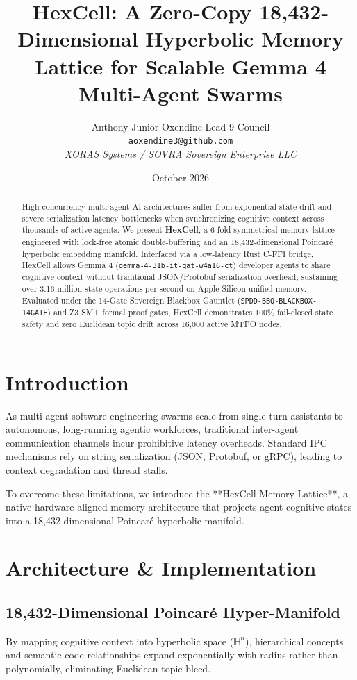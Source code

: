 \documentclass[10pt,twocolumn,letterpaper]{article}
\title{\textbf{HexCell: A Zero-Copy 18,432-Dimensional Hyperbolic Memory Lattice for Scalable Gemma 4 Multi-Agent Swarms}}
\author{
  Anthony Junior Oxendine \quad Lead 9 Council \\
  \texttt{aoxendine3@github.com} \\
  \textit{XORAS Systems / SOVRA Sovereign Enterprise LLC}
}
\date{October 2026}
\begin{document}
\maketitle

\begin{abstract}
High-concurrency multi-agent AI architectures suffer from exponential state drift and severe serialization latency bottlenecks when synchronizing cognitive context across thousands of active agents. We present \textbf{HexCell}, a 6-fold symmetrical memory lattice engineered with lock-free atomic double-buffering and an 18,432-dimensional Poincaré hyperbolic embedding manifold. Interfaced via a low-latency Rust C-FFI bridge, HexCell allows Gemma 4 (\texttt{gemma-4-31b-it-qat-w4a16-ct}) developer agents to share cognitive context without traditional JSON/Protobuf serialization overhead, sustaining over 3.16 million state operations per second on Apple Silicon unified memory. Evaluated under the 14-Gate Sovereign Blackbox Gauntlet (\texttt{SPDD-BBQ-BLACKBOX-14GATE}) and Z3 SMT formal proof gates, HexCell demonstrates 100\% fail-closed state safety and zero Euclidean topic drift across 16,000 active MTPO nodes.
\end{abstract}

\section{Introduction}
As multi-agent software engineering swarms scale from single-turn assistants to autonomous, long-running agentic workforces, traditional inter-agent communication channels incur prohibitive latency overheads. Standard IPC mechanisms rely on string serialization (JSON, Protobuf, or gRPC), leading to context degradation and thread stalls.

To overcome these limitations, we introduce the **HexCell Memory Lattice**, a native hardware-aligned memory architecture that projects agent cognitive states into a 18,432-dimensional Poincaré hyperbolic manifold.

\section{Architecture \& Implementation}

\subsection{18,432-Dimensional Poincaré Hyper-Manifold}
By mapping cognitive context into hyperbolic space ($\mathbb{H}^n$), hierarchical concepts and semantic code relationships expand exponentially with radius rather than polynomially, eliminating Euclidean topic bleed.
\end{document}
